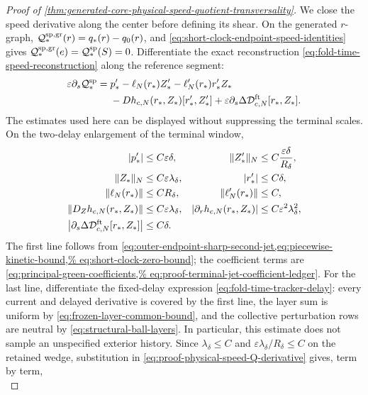 \begin{proof}[Proof of
\cref{thm:generated-core-physical-speed-quotient-transversality}]
We close the speed derivative along the center before defining its shear.
On the generated \(r\)-graph,
\(\mathcal Q_*^{\rm sp,gr}(r)=q_*(r)-q_0(r)\), and
\cref{eq:short-clock-endpoint-speed-identities} gives
\(\mathcal Q_*^{\rm sp,gr}(e)=\mathcal Q_*^{\rm sp}(S)=0\).
Differentiate the exact reconstruction
\cref{eq:fold-time-speed-reconstruction} along the reference segment:
\begin{align}
 \varepsilon\partial_s\mathcal Q_*^{\rm sp}
 ={}&p_*'-\ell_N(r_*)Z_*'
      -\ell_N'(r_*)r_*'Z_*\notag\\
 &-D h_{c,N}(r_*,Z_*)[r_*',Z_*']
   +\varepsilon\partial_s
       \Delta\mathcal D_{c,N}^{\rm ft}[r_*,Z_*].
                                                        \label{eq:proof-physical-speed-Q-derivative}
\end{align}
The estimates used here can be displayed without suppressing the terminal
scales.  On the two-delay enlargement of the terminal window,
\begin{align}
 |p_*'|&\le C\varepsilon\delta,&
 \|Z_*'\|_N&\le C\frac{\varepsilon\delta}{R_\delta},\notag\\
 \|Z_*\|_N&\le C\varepsilon\lambda_\delta,&
 |r_*'|&\le C\delta,\notag\\
 \|\ell_N(r_*)\|&\le CR_\delta,&
 \|\ell_N'(r_*)\|&\le C,\notag\\
 \|D_Zh_{c,N}(r_*,Z_*)\|&\le C\varepsilon\lambda_\delta,&
 |\partial_rh_{c,N}(r_*,Z_*)|
 &\le C\varepsilon^2\lambda_\delta^2,\notag\\
 \left|\partial_s
       \Delta\mathcal D_{c,N}^{\rm ft}[r_*,Z_*]\right|
 &\le C\delta.                                  \label{eq:proof-physical-speed-Q-input-ledger}
\end{align}
The first line follows from
\cref{eq:outer-endpoint-sharp-second-jet,eq:piecewise-kinetic-bound,%
eq:short-clock-zero-bound}; the coefficient terms are
\cref{eq:principal-green-coefficients,%
eq:proof-terminal-jet-coefficient-ledger}.  For the last line,
differentiate the fixed-delay expression
\cref{eq:fold-time-tracker-delay}: every current and delayed derivative is
covered by the first line, the layer sum is uniform by
\cref{eq:frozen-layer-common-bound}, and the collective perturbation rows
are neutral by
\cref{eq:structural-ball-layers}.  In particular, this estimate does not
sample an unspecified exterior history.  Since
\(\lambda_\delta\le C\) and
\(\varepsilon\lambda_\delta/R_\delta\le C\) on the retained wedge,
substitution in
\cref{eq:proof-physical-speed-Q-derivative} gives, term by term,
\begin{equation}

\end{equation}
\end{proof}
